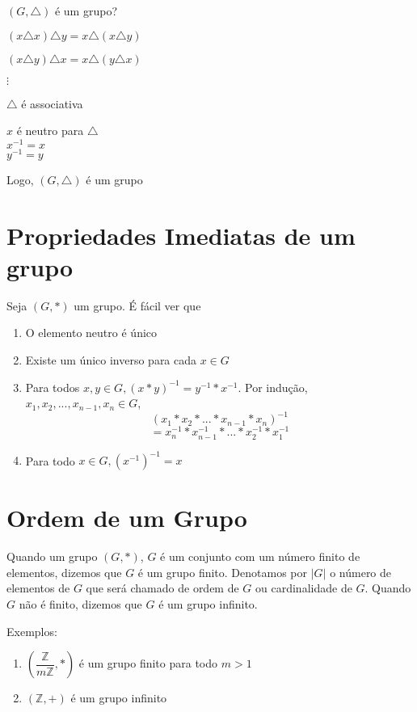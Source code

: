 \begin{enumerate}
$(G,\triangle)$ {\'e} um grupo?

$(x\triangle x)\triangle y= x\triangle(x\triangle y)$

$(x\triangle y)\triangle x=x\triangle(y\triangle x)$

$\vdots$

$\triangle$ {\'e} associativa

$x$ {\'e} neutro para $\triangle$\\
$x^{-1}=x$\\
$y^{-1}=y$

Logo, $(G,\triangle)$ {\'e} um grupo
\end{enumerate}

\section{Propriedades Imediatas de um grupo}

Seja $(G,*)$ um grupo. {\'E} f{\'a}cil ver que
\begin{enumerate}
\item O elemento neutro {\'e} {\'u}nico
\item Existe um {\'u}nico inverso para cada $x\in G$
\item Para todos $x,y\in G,(x*y)^{-1}=y^{-1}*x^{-1}$. Por indu{\c c}{\~a}o, $x_{1},x_{2},...,x_{n-1},x_{n}\in G$, \[(x_{1}*x_{2}*...*x_{n-1}*x_{n})^{-1}\] \[=x^{-1}_{n}*x^{-1}_{n-1}*...*x^{-1}_{2}*x^{-1}_{1}\]
\item Para todo $x\in G, (x^{-1})^{-1}=x$

\end{enumerate}

\section{Ordem de um Grupo}
\begin{definicao}
Quando um grupo $(G,*)$, $G$ {\'e} um conjunto com um n{\'u}mero finito de elementos, dizemos que $G$ {\'e} um grupo finito. Denotamos por $|G|$ o n{\'u}mero de elementos de $G$ que ser{\'a} chamado de ordem de $G$ ou cardinalidade de $G$. Quando $G$ n{\~a}o {\'e} finito, dizemos que $G$ {\'e} um grupo infinito.
\end{definicao}

Exemplos:
\begin{enumerate}
\item $\left(\dfrac{\mathbb{Z}}{m\mathbb{Z}}, *\right)$ {\'e} um grupo finito para todo $m>1$
\item $(\mathbb{Z}, +)$ {\'e} um grupo infinito
\end{enumerate}

